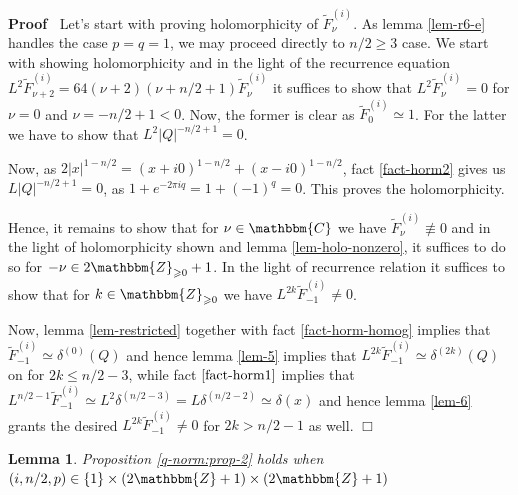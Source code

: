 \documentclass{article}
\newcommand{\nequiv}{\not\equiv}
\newcommand{\nocomma}{}
\newenvironment{proof}{\noindent\textbf{Proof\ }}{\hspace*{\fill}$\Box$\medskip}
\numberwithin{definition}{section}
\newtheorem{lemma}{Lemma}
\numberwithin{lemma}{section}
\numberwithin{proposition}{section}
{\theorembodyfont{\rmfamily}\newtheorem{remark}{Remark}
\numberwithin{remark}{section}
}
\begin{document}
\begin{proof}
  Let's start with proving holomorphicity of $\tilde{F}^{( i)}_{\nu}$. As
  lemma \ref{lem-r6-e} handles the case $p = q = 1$, we may proceed directly
  to $n / 2 \geqslant 3$ case. We start with showing holomorphicity and in the
  light of the recurrence equation $L^2 \tilde{F}_{\nu + 2}^{( i)} = 64 ( \nu
  + 2) ( \nu + n / 2 + 1) \tilde{F}_{\nu}^{( i)}$ it suffices to show that
  $L^2 \tilde{F}^{( i)}_{\nu} = 0$ for $\nu = 0$ and $\nu = - n / 2 + 1 < 0$.
  Now, the former is clear as $\tilde{F}_0^{( i)} \simeq 1$. For the latter we
  have to show that $L^2 | Q |^{- n / 2 + 1} = 0$.
  
  Now, as $2 | x |^{1 - n / 2} = ( x + i 0)^{1 - n / 2} + ( x - i 0)^{1 - n /
  2} \nocomma$, fact \ref{fact-horm2} gives us $L | Q |^{- n / 2 + 1} = 0$, as
  $1 + e^{- 2 \pi i q} = 1 + ( - 1)^q = 0$. This proves the holomorphicity.
  
  Hence, it remains to show that for $\nu \in \mathbbm{C}$ we have
  $\tilde{F}_{\nu}^{( i)} \nequiv 0$ and in the light of holomorphicity shown
  and lemma \ref{lem-holo-nonzero}, it suffices to do so for $- \nu \in
  2\mathbbm{Z}_{\geqslant 0} + 1$. In the light of recurrence relation it
  suffices to show that for $k \in \mathbbm{Z}_{\geqslant 0}$ we have $L^{2 k}
  \tilde{F}_{- 1}^{( i)} \neq 0$.
  
  Now, lemma \ref{lem-restricted} together with fact \ref{fact-horm-homog}
  implies that $\tilde{F}_{- 1}^{( i)} \simeq \delta^{( 0)} ( Q)$ and hence
  lemma \ref{lem-5} implies that $L^{2 k} \tilde{F}_{- 1}^{( i)} \simeq
  \delta^{( 2 k)} ( Q)$ on for $2 k \leqslant n / 2 - 3$, while fact
  $\ref{fact-horm1}$ implies that $L^{n / 2 - 1} \tilde{F}_{- 1}^{( i)} \simeq
  L^2 \delta^{( n / 2 - 3)} = L \delta^{( n / 2 - 2)} \simeq \delta ( x)$ and
  hence lemma \ref{lem-6} grants the desired $L^{2 k} \tilde{F}_{- 1}^{( i)}
  \neq 0$ for $2 k > n / 2 - 1$ as well.
\end{proof}

\begin{lemma}
  \label{lem-r8}Proposition \ref{q-norm:prop-2} holds when $( i, n / 2, p) \in
  \{ 1 \} \times ( 2\mathbbm{Z}+ 1) \times ( 2\mathbbm{Z}+ 1)$
\end{lemma}
\end{document}
